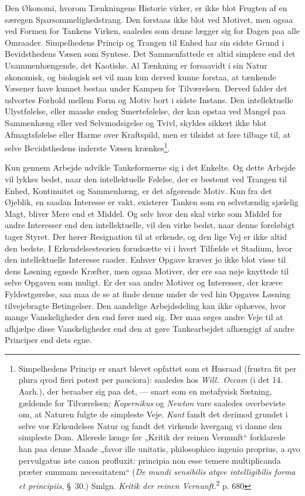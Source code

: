 \documentclass[12pt,a4paper]{book}
\newcommand{\opage}[1]{\marginnote{\footnotesize\textit{[#1]}}}
\begin{document}
Den Økonomi, hvorom Tænkningens Historie virker, er ikke blot Frugten af en særegen
Sparsommelighedstrang. Den forstaas ikke blot ved Motivet, men ogsaa ved Formen for
Tankens Virken, saaledes som denne lægger sig for Dagen paa alle Omraader.
Simpelhedens Princip og Trangen til Enhed har sin sidste Grund i Bevidsthedens Væsen
som Syntese. Det Sammenfattede er altid simplere end det Usammenhængende, det
Kaotiske. Al Tænkning er forsaavidt i sin Natur økonomisk, og biologisk set vil man
kun derved kunne forstaa, at tænkende Væsener have kunnet bestaa under Kampen for
Tilværelsen. Derved falder det udvortes Forhold mellem Form og Motiv bort i sidste
Instans. Den intellektuelle Ulystfølelse, eller maaske endog Smertefølelse, der kan
opstaa ved Mangel paa Sammenhæng eller ved Selvmodsigelse og Tvivl, skyldes sikkert
ikke blot Afmagtsfølelse \opage{272} eller Harme over Kraftspild, men er tilsidst at føre
tilbage til, at selve Bevidsthedens inderste Væsen krænkes\footnote{Simpelhedens
Princip er snart blevet opfattet som et Husraad (frustra fit per plura qvod fieri
potest per pauciora): saaledes hos \emph{Will.\ Occam} (i det 14. Aarh.), der
beraaber sig paa det, --- snart som en metafysisk Sætning, gældende for
Tilværelsen; \emph{Kopernikus} og \emph{Newton} vare saaledes overbeviste om, at
Naturen fulgte de simpleste Veje. \emph{Kant} fandt det derimod grundet i selve vor
Erkendelses Natur og fandt det virkende hvergang vi danne den simpleste Dom.
Allerede længe før „Kritik der reinen Vernunft“ forklarede han paa denne Maade
„favor ille unitatis, philosophico ingenio proprius, a qvo pervulgatus iste canon
profluxit: principia non esse temere multiplicanda præter summam necessitatem“
(\emph{De mundi sensibilis atqve intelligibilis forma et principiis}, \S\ 30.)
Smlgn. \emph{Kritik der reinen Vernunft}.\textsuperscript{2} p. 680}.

Kun gennem Arbejde udvikle Tankeformerne sig i det Enkelte. Og dette Arbejde vil
lykkes bedst, naar den intellektuelle Følelse, der er bestemt ved Trangen til
Enhed, Kontinuitet og Sammenhæng, er det afgørende Motiv. Kun fra det Øjeblik, en
saadan Interesse er vakt, existerer Tanken som en selvstændig sjælelig Magt, bliver
Mere end et Middel. Og selv hvor den skal virke som Middel for andre Interesser end
den intellektuelle, vil den virke bedst, naar denne foreløbigt tager Styret. Der
hører Resignation til at erkende, og den lige Vej er ikke altid den bedste. I
Erkendelsesteorien forudsætte vi i hvert Tilfælde et Stadium, hvor den
intellektuelle Interesse raader. Enhver Opgave kræver jo ikke blot visse til dens
Løsning egnede Kræfter, men ogsaa Motiver, der ere saa nøje knyttede til selve
Opgaven som muligt. Er der saa andre Motiver og Interesser, der kræve
Fyldestgørelse, saa maa de se at finde denne under de ved hin Opgaves Løsning
tilvejebragte Betingelser. Den aandelige Arbejdsdeling kan ikke ophæves, hvor mange
Vanskeligheder den end fører med sig. Der maa søges andre Veje til at afhjælpe disse
Vanskeligheder end den at gøre Tankearbejdet afhængigt af andre Principer end dets
egne.
\end{document}
